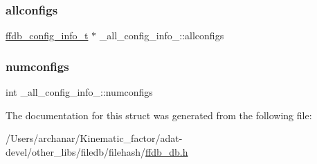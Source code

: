 \subsubsection{\texorpdfstring{allconfigs}{allconfigs}}
{\footnotesize\ttfamily \mbox{\hyperlink{adat-devel_2other__libs_2filedb_2filehash_2ffdb__db_8h_acc961fbd2faf6a849a1620309100fda1}{ffdb\+\_\+config\+\_\+info\+\_\+t}} $\ast$ \+\_\+all\+\_\+config\+\_\+info\+\_\+\+::allconfigs}

\mbox{\label{struct__all__config__info___a581857c25b21cf9e4b7f87396aefca30}} 
\subsubsection{\texorpdfstring{numconfigs}{numconfigs}}
{\footnotesize\ttfamily int \+\_\+all\+\_\+config\+\_\+info\+\_\+\+::numconfigs}



The documentation for this struct was generated from the following file\+:\begin{DoxyCompactItemize}
\item 
/\+Users/archanar/\+Kinematic\+\_\+factor/adat-\/devel/other\+\_\+libs/filedb/filehash/\mbox{\hyperlink{adat-devel_2other__libs_2filedb_2filehash_2ffdb__db_8h}{ffdb\+\_\+db.\+h}}\end{DoxyCompactItemize}
